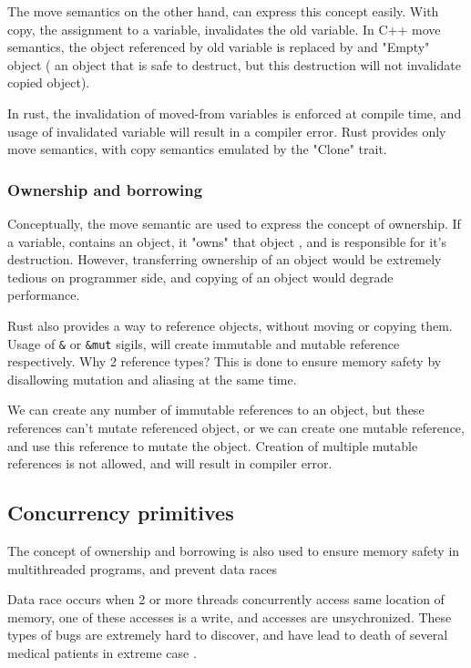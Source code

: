 The move semantics on the other hand, can express this concept easily. With copy, the assignment to a variable, invalidates the
old variable. In C++ move semantics, the object referenced by old variable is replaced by and "Empty" object ( an object
that is safe to destruct, but this destruction will not invalidate copied object).

In rust, the invalidation of moved-from variables is enforced at compile time, and usage of invalidated variable will result in a
compiler error. Rust provides only move semantics, with copy semantics emulated by the "Clone" trait.

\subsubsection{Ownership and borrowing}
Conceptually, the move semantic are used to express the concept of ownership. If a variable, contains an object, it "owns"
that object , and is responsible for it's destruction. However, transferring ownership of an object would be extremely
tedious on programmer side, and copying of an object would degrade performance.

Rust also provides a way to reference objects, without moving or copying them. Usage of  \verb|&| or
\verb|&mut| sigils, will create immutable and mutable reference respectively. Why 2 reference types? This is
done to ensure memory safety by disallowing mutation and aliasing at the same time.

We can create any number of immutable references to an object, but these references can't mutate referenced object, or
we can create one mutable reference, and use this reference to mutate the object. Creation of multiple mutable references
is not allowed, and will result in compiler error.


\subsection{Concurrency primitives}
The concept of ownership and borrowing is also used to ensure memory safety in multithreaded programs, and prevent
data races

Data race occurs when 2 or more threads concurrently access same location of memory, one of these accesses is a write,
and accesses are unsychronized. These types of bugs are extremely hard to discover, and have lead to death of several medical patients in
extreme case .

